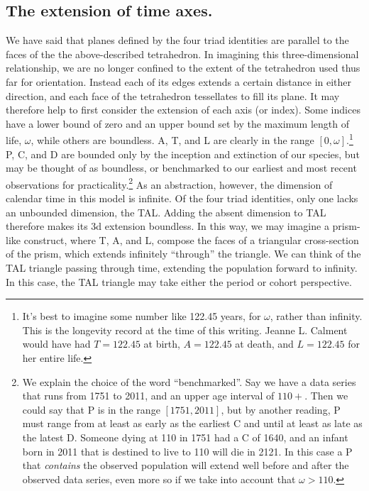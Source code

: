 \documentclass[12pt,oneside,a4paper]{article} %
\begin{document}
\subsection{The extension of time axes.}
We have said that planes defined by the four triad identities are parallel to
the faces of the the above-described tetrahedron. In imagining this three-dimensional
relationship, we are no longer confined to the extent of the tetrahedron used thus far for orientation. Instead each of its edges extends a
certain distance in either direction, and each face of the tetrahedron
tessellates to fill its plane.
It may therefore help to first consider the extension of each axis (or index).
Some indices have a lower bound of zero and an upper bound set by the maximum
length of life, $\omega$, while others are boundless. A, T, and L
are clearly in the range $[0,\omega]$.\footnote{It's best to imagine some number like 122.45 years, for $\omega$, rather than infinity. This is the longevity record at the time of this writing. Jeanne L. Calment would have had
$T=122.45$ at birth, $A = 122.45$ at death, and $L=122.45$ for
her entire life.} P, C, and D are bounded only by the inception and extinction of
our species, but may be thought of as boundless, or benchmarked
to our earliest and most recent observations for practicality.\footnote{We
explain the choice of the word ``benchmarked''. Say we have a data series that runs from 1751 to 2011, and an upper age
interval of $110+$. Then we could say that P is in the range $[1751,2011]$,
but by another reading, P must range from at least as early as the earliest
C and until at least as late as the latest D. Someone dying at 110 in 1751
had a C of 1640, and an infant born in 2011 that is destined to live to 110
will die in 2121. In this case a P that \textit{contains} the observed
population will extend well before and after the observed data series, even
more so if we take into account that $\omega > 110$.} As an abstraction,
however, the dimension of calendar time in this model is infinite. Of the four
triad identities, only one lacks an unbounded dimension, the TAL. Adding
the absent dimension to TAL therefore makes its 3d extension boundless. In
this way, we may imagine a prism-like construct, where T, A, and L, compose
the faces of a triangular cross-section of the prism, which extends infinitely
``through'' the triangle.
We can think of the TAL triangle passing through time, extending the population
forward to infinity. In this case, the TAL triangle may take either the period
or cohort perspective. 
\end{document}
